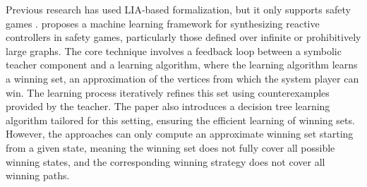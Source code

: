 \documentclass[review]{elsarticle}
\begin{document}
Previous research has used LIA-based formalization, but it only supports safety games \citep{DanO2019}.
\citet{DanO2019} proposes a machine learning framework for synthesizing reactive controllers in safety games, particularly those defined over infinite or prohibitively large graphs. The core technique involves a feedback loop between a symbolic teacher component and a learning algorithm, where the learning algorithm learns a winning set, an approximation of the vertices from which the system player can win. The learning process iteratively refines this set using counterexamples provided by the teacher.
The paper also introduces a decision tree learning algorithm tailored for this setting, ensuring the efficient learning of winning sets. 
However, the approaches can only compute an approximate winning set starting from a given state, meaning the winning set does not fully cover all possible winning states, and the corresponding winning strategy does not cover all winning paths.

\end{document}
